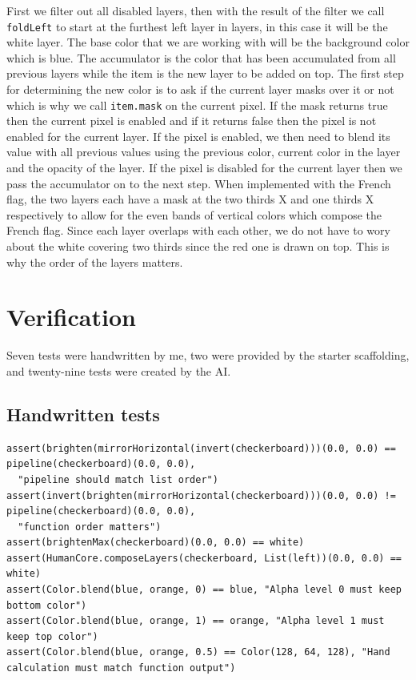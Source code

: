 \documentclass[11pt,letterpaper]{article}
\newcommand{\code}[1]{\texttt{#1}}
\begin{document}
First we filter out all disabled layers, then with the result of the filter we call \code{foldLeft} to start at the furthest left layer in layers, in this case it will be the white layer. The base color that we are working with will be the background color which is blue. The accumulator is the color that has been accumulated from all previous layers while the item is the new layer to be added on top. The first step for determining the new color is to ask if the current layer masks over it or not which is why we call \code{item.mask} on the current pixel. If the mask returns true then the current pixel is enabled and if it returns false then the pixel is not enabled for the current layer. If the pixel is enabled, we then need to blend its value with all previous values using the previous color, current color in the layer and the opacity of the layer. If the pixel is disabled for the current layer then we pass the accumulator on to the next step. When implemented with the French flag, the two layers each have a mask at the two thirds X and one thirds X respectively to allow for the even bands of vertical colors which compose the French flag. Since each layer overlaps with each other, we do not have to wory about the white covering two thirds since the red one is drawn on top. This is why the order of the layers matters.

\section{Verification}

Seven tests were handwritten by me, two were provided by the starter scaffolding, and twenty-nine tests were created by the AI.

\subsection{Handwritten tests}

\begin{lstlisting}[caption={Handwritten tests (\code{Checks} in \code{Preview.scala})}]
assert(brighten(mirrorHorizontal(invert(checkerboard)))(0.0, 0.0) == pipeline(checkerboard)(0.0, 0.0),
  "pipeline should match list order")
assert(invert(brighten(mirrorHorizontal(checkerboard)))(0.0, 0.0) != pipeline(checkerboard)(0.0, 0.0),
  "function order matters")
assert(brightenMax(checkerboard)(0.0, 0.0) == white)
assert(HumanCore.composeLayers(checkerboard, List(left))(0.0, 0.0) == white)
assert(Color.blend(blue, orange, 0) == blue, "Alpha level 0 must keep bottom color")
assert(Color.blend(blue, orange, 1) == orange, "Alpha level 1 must keep top color")
assert(Color.blend(blue, orange, 0.5) == Color(128, 64, 128), "Hand calculation must match function output")
\end{lstlisting}
\end{document}
